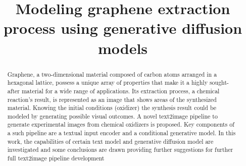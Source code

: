 \documentclass[runningheads]{llncs}
\begin{document}
%
\title{Modeling graphene extraction process using generative diffusion models}%
%
%
%
%
%
\maketitle              %
%
\begin{abstract}
Graphene, a two-dimensional material composed of carbon
atoms arranged in a hexagonal lattice, possess a unique array of properties that make it a highly sought-after material for a wide range of applications. Its extraction process, a chemical reaction’s result, is represented as an image that shows areas of the synthesized material. Knowing the initial conditions (oxidizer) the synthesis result could be modeled by generating possible visual outcomes. A novel text2image pipeline to generate experimental images from chemical oxidizers is proposed. Key components of a such pipeline are a textual input encoder and a conditional generative model. In this work, the capabilities of certain text model and generative diffusion model are investigated and some conclusions are drawn providing further suggestions for further full text2image pipeline development\end{abstract}
%
%
%
\end{document}
